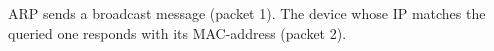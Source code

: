 ARP sends a broadcast message (packet 1). The device whose IP matches the queried one responds with its MAC-address (packet 2).